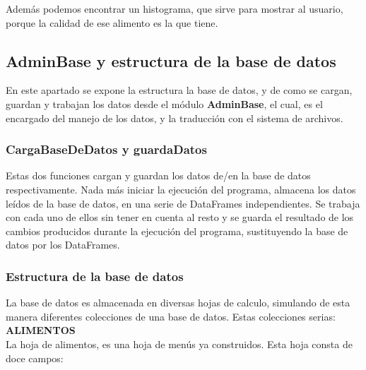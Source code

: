 Además podemos encontrar un histograma, que sirve para mostrar al usuario, porque la calidad de ese alimento es la que tiene.\\

\subsection{AdminBase y estructura de la base de datos}
En este apartado se expone la estructura la base de datos, y de como se cargan, guardan y  trabajan los datos desde el módulo \textbf{AdminBase}, el cual, es el encargado del manejo de los datos, y la traducción con el sistema de archivos.
\subsubsection{CargaBaseDeDatos y guardaDatos}
Estas dos funciones cargan y guardan los datos de/en la base de datos respectivamente. Nada más iniciar la ejecución del programa, almacena los datos leídos de la base de datos, en una serie de DataFrames independientes. Se trabaja con cada uno de ellos sin tener en cuenta al resto y se guarda el resultado de los cambios producidos durante la ejecución del programa, sustituyendo la base de datos por los DataFrames. \\

\subsubsection{Estructura de la base de datos}
La base de datos es almacenada en diversas hojas de calculo, simulando de esta manera diferentes colecciones de una base de datos. Estas colecciones serias:
\textbf{\textsc{ALIMENTOS}}\\
La hoja de alimentos, es una hoja de menús ya construidos. Esta hoja consta de doce campos:\\

